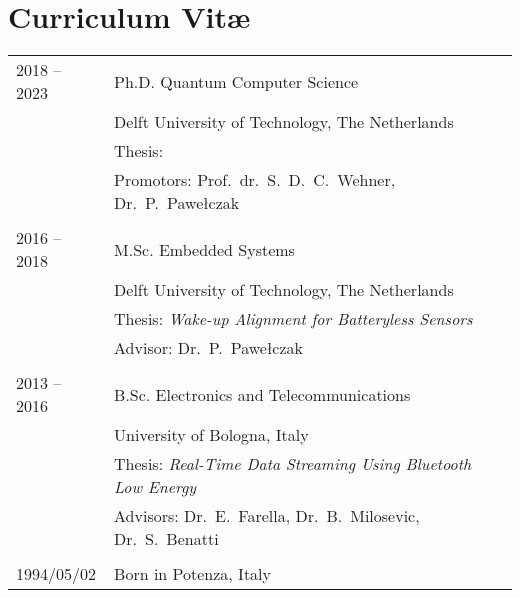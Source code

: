 \chapter*{Curriculum Vit\ae}

\makeatletter
\authors{\@firstname\ {\titleshape\@lastname}}
\def\thesistitle{\@title}
\makeatother

\newlength{\tabcolsepold}
\setlength{\tabcolsepold}{\tabcolsep}
\setlength{\tabcolsep}{0cm}

\noindent
\begin{tabularx}{\linewidth}{p{2cm}X}
    2018 -- 2023 & Ph.D. Quantum Computer Science \\
                 & Delft University of Technology, The Netherlands \\
                 & Thesis: \emph{\thesistitle} \\
                 & Promotors: Prof.\ dr.\ S.\ D.\ C.\ Wehner, Dr.\ P.\ Pawełczak \\
    \\
    2016 -- 2018 & M.Sc. Embedded Systems \\
                 & Delft University of Technology, The Netherlands \\
                 & Thesis: \emph{Wake-up Alignment for Batteryless Sensors} \\
                 & Advisor: Dr.\ P.\ Pawełczak \\
    \\
    2013 -- 2016 & B.Sc. Electronics and Telecommunications \\
                 & University of Bologna, Italy \\
                 & Thesis: \emph{Real-Time Data Streaming Using Bluetooth Low Energy} \\
                 & Advisors: Dr.\ E.\ Farella, Dr.\ B.\ Milosevic, Dr.\ S.\ Benatti \\
    \\
    1994/05/02   & Born in Potenza, Italy \\
\end{tabularx}

\setlength{\tabcolsep}{\tabcolsepold}
